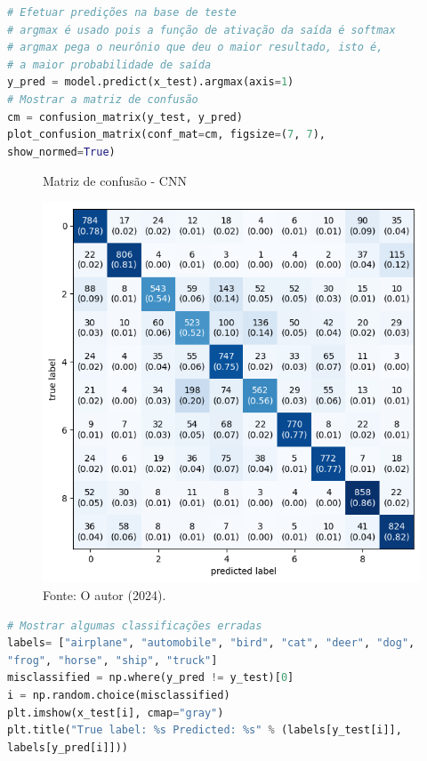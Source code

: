 \begin{lstlisting}[language=Python, style=input]
# Efetuar predições na base de teste
# argmax é usado pois a função de ativação da saída é softmax
# argmax pega o neurônio que deu o maior resultado, isto é,
# a maior probabilidade de saída
y_pred = model.predict(x_test).argmax(axis=1)
# Mostrar a matriz de confusão
cm = confusion_matrix(y_test, y_pred)
plot_confusion_matrix(conf_mat=cm, figsize=(7, 7),
show_normed=True)
\end{lstlisting}

\begin{figure}[H]
\centering
\caption{Matriz de confusão - CNN}
\includegraphics[width=.8\linewidth]{apendices/fig/9_IAA009_3.png}
\caption*{Fonte: O autor (2024).}
\end{figure}

\begin{lstlisting}[language=Python, style=input]
# Mostrar algumas classificações erradas
labels= ["airplane", "automobile", "bird", "cat", "deer", "dog",
"frog", "horse", "ship", "truck"]
misclassified = np.where(y_pred != y_test)[0]
i = np.random.choice(misclassified)
plt.imshow(x_test[i], cmap="gray")
plt.title("True label: %s Predicted: %s" % (labels[y_test[i]],
labels[y_pred[i]]))
\end{lstlisting}

